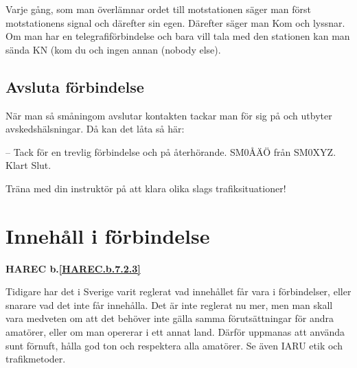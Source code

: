 Varje gång, som man överlämnar ordet till motstationen
säger man först motstationens signal och därefter sin egen. Därefter
säger man Kom och lyssnar. Om man har en telegrafiförbindelse och bara
vill tala med den stationen kan man sända KN (kom du och ingen annan
(nobody else).

\subsection{Avsluta förbindelse}

När man så småningom avslutar kontakten tackar man för sig på och
utbyter avskedshälsningar. Då kan det låta så här:

-- Tack för en trevlig förbindelse och på återhörande. SM0ÅÄÖ från
SM0XYZ. Klart Slut.

Träna med din instruktör på att klara olika slags trafiksituationer!

\section{Innehåll i förbindelse}
\textbf{HAREC
  b.\ref{HAREC.b.7.2.3}\label{myHAREC.b.7.2.3}
}

Tidigare har det i Sverige varit reglerat vad innehållet får vara i
förbindelser, eller snarare vad det inte får innehålla. Det är inte reglerat
nu mer, men man skall vara medveten om att det behöver inte gälla samma
förutsättningar för andra amatörer, eller om man opererar i ett annat land.
Därför uppmanas att använda sunt förnuft, hålla god ton och respektera alla
amatörer. Se även IARU etik och trafikmetoder.

